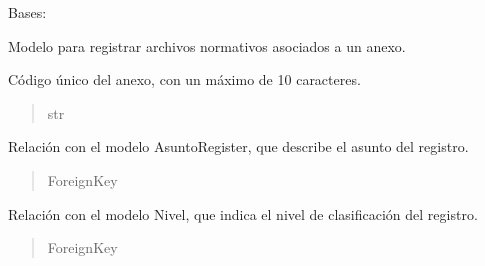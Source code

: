 \documentclass[letterpaper,10pt,spanish]{sphinxmanual}
\begin{document}
\begin{fulllineitems}

\pysigstartsignatures
{}
\pysigstopsignatures
\sphinxAtStartPar
Bases: 

\sphinxAtStartPar
Modelo para registrar archivos normativos asociados a un anexo.


\begin{fulllineitems}

\pysigstartsignatures
{}
\pysigstopsignatures
\sphinxAtStartPar
Código único del anexo, con un máximo de 10 caracteres.
\begin{quote}\begin{description}
\sphinxAtStartPar
str

\end{description}\end{quote}

\end{fulllineitems}



\begin{fulllineitems}

\pysigstartsignatures
{}
\pysigstopsignatures
\sphinxAtStartPar
Relación con el modelo AsuntoRegister, que describe el asunto del registro.
\begin{quote}\begin{description}
\sphinxAtStartPar
ForeignKey

\end{description}\end{quote}

\end{fulllineitems}



\begin{fulllineitems}

\pysigstartsignatures
{}
\pysigstopsignatures
\sphinxAtStartPar
Relación con el modelo Nivel, que indica el nivel de clasificación del registro.
\begin{quote}\begin{description}
\sphinxAtStartPar
ForeignKey


\end{description}
\end{quote}
\end{fulllineitems}
\end{fulllineitems}
\end{document}
